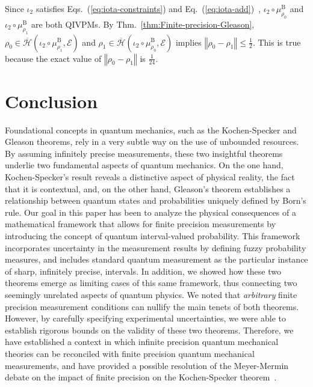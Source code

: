 \documentclass[english,reprint, aps, prl,superscriptaddress, showpacs,
showkeys, longbibliography, amsmath, amssymb, floatfix]{revtex4-1}
\theoremstyle{plain}
\theoremstyle{definition}
\newcommand{\Hilb}{\mathcal{H}}
\newcommand{\events}{\ensuremath{\mathcal{E}}}
\newcommand{\coreBorn}{\ensuremath{\overline{\Hilb}}}
\begin{document}
Since $\iota_{2}$ satisfies Eqs.~(\ref{eq:iota-constraints}) and
Eq.~(\ref{eq:iota-add})~\citep{HOSTunpublished}, $\iota_{2}\circ\mu_{\rho_{0}}^{\mathrm{B}}$
and $\iota_{2}\circ\mu_{\rho_{1}}^{\mathrm{B}}$ are both QIVPMs.
By Thm.~\ref{thm:Finite-precision-Gleason}, $\rho_{0}\in\coreBorn\left(\iota_{2}\circ\mu_{\rho_{1}}^{\mathrm{B}},\events\right)$
and $\rho_{1}\in\coreBorn\left(\iota_{2}\circ\mu_{\rho_{0}}^{\mathrm{B}},\events\right)$
implies $\left\Vert \rho_{0}-\rho_{1}\right\Vert \le\frac{1}{2}$.
This is true because the exact value of $\left\Vert \rho_{0}-\rho_{1}\right\Vert $
is $\frac{1}{24}$.

\section{Conclusion}
\label{sec:Conclusion}
  
Foundational concepts in quantum mechanics, such as the Kochen-Specker
and Gleason theorems, rely in a very subtle way on the use of
unbounded resources. By assuming infinitely precise measurements,
these two insightful theorems underlie two fundamental aspects of
quantum mechanics. On the one hand, Kochen-Specker's result reveals a
distinctive aspect of physical reality, the fact that it is
contextual, and, on the other hand, Gleason's theorem establishes a
relationship between quantum states and probabilities uniquely defined
by Born's rule.  Our goal in this paper has been to analyze the
physical consequences of a mathematical framework that allows for
finite precision measurements by introducing the concept of quantum
interval-valued probability. This framework incorporates uncertainty
in the measurement results by defining fuzzy probability measures, and
includes standard quantum measurement as the particular instance of
sharp, infinitely precise, intervals.  In addition, we showed how
these two theorems emerge as limiting cases of this same framework,
thus connecting two seemingly unrelated aspects of quantum physics. We
noted that {\it arbitrary\/} finite precision measurement conditions
can nullify the main tenets of both theorems. However, by carefully
specifying experimental uncertainties, we were able to establish
rigorous bounds on the validity of these two theorems. Therefore, we
have established a context in which infinite precision quantum
mechanical theories can be reconciled with finite precision quantum
mechanical measurements, and have provided a possible resolution of
the Meyer-Mermin debate on the impact of finite precision on the
Kochen-Specker theorem~\cite{PhysRevLett.83.3751,Mermin1999}.



\end{document}
